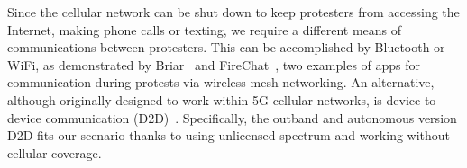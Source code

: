 
Since the cellular network can be shut down to keep protesters from
accessing the Internet, making phone calls or texting, we require a
different means of communications between protesters. This can be
accomplished by Bluetooth or WiFi, as demonstrated by
Briar~\cite{Briar} and FireChat~\cite{FireChat}, two examples of apps
for communication during protests via wireless mesh networking. An
alternative, although originally designed to work within 5G cellular
networks, is device-to-device communication (D2D)~\cite{D2D}. Specifically, the
outband and autonomous version D2D fits our scenario thanks to using
unlicensed spectrum and working without cellular coverage.
